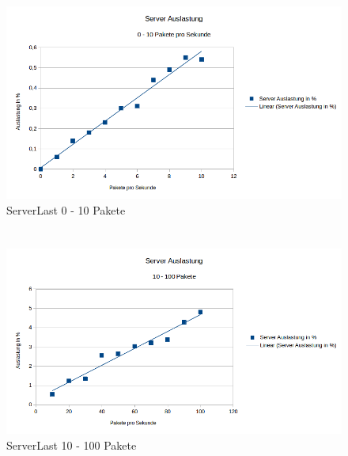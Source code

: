 \documentclass[a4paper]{spie}  %
\begin{document}
\begin{appendices}
\section{}
\begin{figure}[H]
	\centering
	\includegraphics[width=1\textwidth]{images/ServerLast1.png}
	\caption{ServerLast 0 - 10 Pakete}
	\label{serverlast1}
\end{figure}

\section{}
\begin{figure}[H]
	\centering
	\includegraphics[width=1\textwidth]{images/ServerLast2.png}
	\caption{ServerLast 10 - 100 Pakete}
	\label{serverlast1-2}
\end{figure}



\end{appendices}
\end{document}
